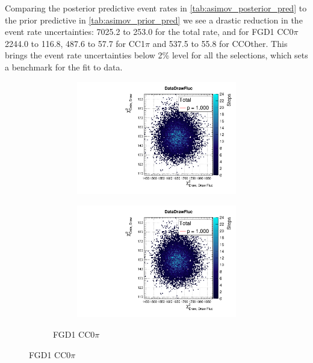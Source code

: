 Comparing the posterior predictive event rates in \autoref{tab:asimov_posterior_pred} to the prior predictive in \autoref{tab:asimov_prior_pred} we see a drastic reduction in the event rate uncertainties: 7025.2 to 253.0 for the total rate, and for FGD1 CC0$\pi$ 2244.0 to 116.8, 487.6 to 57.7 for CC1$\pi$ and 537.5 to 55.8 for CCOther. This brings the event rate uncertainties below 2\% level for all the selections, which sets a benchmark for the fit to data.
\begin{figure}[h]
	\begin{subfigure}[t]{\textwidth}
	\begin{subfigure}[t]{0.49\textwidth}
		\includegraphics[width=\textwidth, trim={0mm 10mm 0mm 11mm}, clip,page=5]{figures/mach3/Asimov/2017b_NewDet_3Xsec_4Det_5Flux_NewXSecTune_Asimov_merge_PostPred_procs}
	\end{subfigure}
	\begin{subfigure}[t]{0.49\textwidth}
		\includegraphics[width=\textwidth, trim={0mm 10mm 0mm 11mm}, clip,page=7]{figures/mach3/Asimov/2017b_NewDet_3Xsec_4Det_5Flux_NewXSecTune_Asimov_merge_PostPred_procs}
	\end{subfigure}
\caption{FGD1 CC0$\pi$}
\end{subfigure}


\end{figure}
